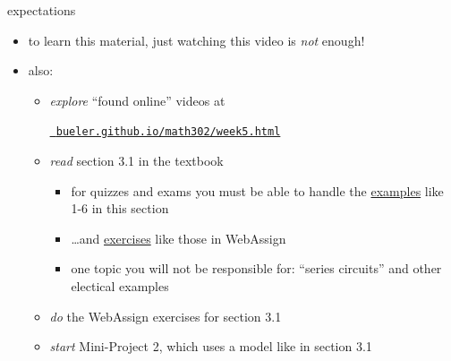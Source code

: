 \documentclass{beamer}
\begin{document}
\begin{frame}{expectations}

\begin{itemize}
\item to learn this material, just watching this video is \emph{not} enough!

\item also:
     \begin{itemize}
     \item \emph{explore} ``found online'' videos at

     \centerline{\href{https://bueler.github.io/math302/week5.html}{\tt \color{cyan} bueler.github.io/math302/week5.html}}
     \item \emph{read} section 3.1 in the textbook
         \begin{itemize}
         \item for quizzes and exams you must be able to handle the \underline{examples} like 1-6 in this section
         \item \dots and \underline{exercises} like those in WebAssign
         \item one topic you will not be responsible for: ``series circuits'' and other electical examples
         \end{itemize}
     \item \emph{do} the WebAssign exercises for section 3.1
     \item \emph{start} Mini-Project 2, which uses a model like in section 3.1
     \end{itemize}
\end{itemize}
\end{frame}
\end{document}
